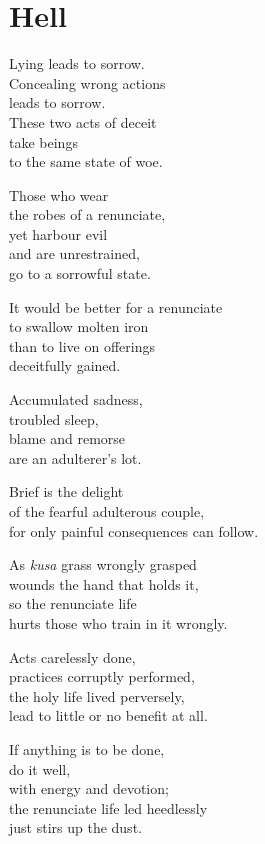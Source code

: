
\chapter{Hell}


Lying leads to sorrow.\\
Concealing wrong actions\\
leads to sorrow.\\
These two acts of deceit\\
take beings\\
to the same state of woe.


Those who wear\\
the robes of a renunciate,\\
yet harbour evil\\
and are unrestrained,\\
go to a sorrowful state.


It would be better for a renunciate\\
to swallow molten iron\\
than to live on offerings\\
deceitfully gained.


Accumulated sadness,\\
troubled sleep,\\
blame and remorse\\
are an adulterer's lot.


Brief is the delight\\
of the fearful adulterous couple,\\
for only painful consequences can follow.


As \emph{kusa} grass wrongly grasped\\
wounds the hand that holds it,\\
so the renunciate life\\
hurts those who train in it wrongly.


Acts carelessly done,\\
practices corruptly performed,\\
the holy life lived perversely,\\
lead to little or no benefit at all.


If anything is to be done,\\
do it well,\\
with energy and devotion;\\
the renunciate life led heedlessly\\
just stirs up the dust.


